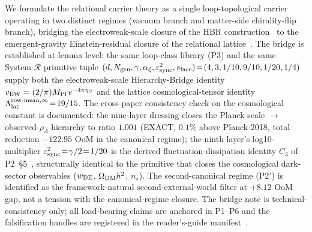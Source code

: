 
We formulate the relational carrier theory as a single
loop-topological carrier operating in two distinct regimes (vacuum
branch and matter-side chirality-flip branch), bridging the
electroweak-scale closure of the HBR construction~\cite{Paper1}
to the emergent-gravity Einstein-residual closure of the
relational lattice~\cite{Paper4}. The bridge is established at
lemma level: the same loop-class library (P3) and the same
System-$\mathcal R$ primitive tuple
$(d, N_{\rm gen}, \gamma, \alpha_{\xi},
\varepsilon_{\rm sync}^{2}, s_{\rm face})\!=\!(4, 3, 1/10, 9/10,
1/20, 1/4)$ supply both the electroweak-scale Hierarchy-Bridge
identity $v_{\rm EW}=(2/\pi)M_{\rm Pl}\,e^{-4\pi\eta_{S}}$ and
the lattice cosmological-tensor identity
$\Lambda_{\rm lat}^{\rm row\text{-}mean,\infty}\!=\!19/15$. The
cross-paper consistency check on the cosmological constant is
documented: the nine-layer dressing closes the
Planck-scale $\to$ observed-$\rho_{\Lambda}$ hierarchy to ratio
$1.001$ (EXACT, $0.1\%$ above Planck-2018, total reduction
$-122.95$ OoM in the canonical regime); the ninth layer's
log10-multiplier $\varepsilon_{\rm sync}^{2}\!=\!\gamma/2\!=\!1/20$
is the derived fluctuation-dissipation identity $C_{3}$ of
P2~\S5~\cite{Paper2}, structurally identical to the primitive that
closes the cosmological dark-sector observables ($w_{\rm DE}$,
$\Omega_{\rm DM} h^{2}$, $n_{s}$). The second-canonical regime
(P2$'$) is identified as the framework-natural second-external-world
filter at $+8.12$ OoM gap, not a tension with the canonical-regime
closure. The bridge note is technical-consistency only; all
load-bearing claims are anchored in P1--P6 and the falsification
handles are registered in the reader's-guide manifest~\cite{Paper0}.
